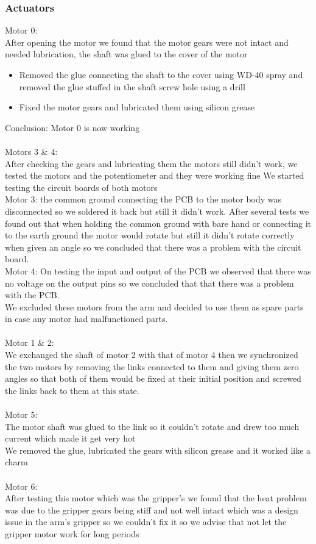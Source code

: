 \documentclass[11pt,a4paper]{report}
\begin{document}
\subsubsection{Actuators}
Motor 0:\\ 
After opening the motor we found that the motor gears were not intact and needed lubrication, the shaft was glued to the cover of the motor
\begin{itemize}
\item Removed the glue connecting the shaft to the cover using WD-40 spray and removed the glue stuffed in the shaft screw hole using a drill
\item Fixed the motor gears and lubricated them using silicon grease
\end{itemize}
Conclusion: Motor 0 is now working\\\\
Motors 3 \& 4: \\
After checking the gears and lubricating them the motors still didn't work, we tested the motors and the potentiometer and they were working fine We started testing the circuit boards of both motors\\
Motor 3: the common ground connecting the PCB to the motor body was disconnected so we soldered it back but still it didn't work. After several tests we found out that when holding the common ground with bare hand or connecting it to the earth ground the motor would rotate but still it didn't rotate correctly when given an angle so we concluded that there was a problem with the circuit board.\\
Motor 4: On testing the input and output of the PCB we observed that there was no voltage on the output pins so we concluded that that there was a problem with the PCB.\\
We excluded these motors from the arm and decided to use them as spare parts in case any motor had malfunctioned parts.\\\\
Motor 1 \& 2:\\
We exchanged the shaft of motor 2 with that of motor 4 then we synchronized the two motors by removing the links connected to them and giving them zero angles so that both of them would be fixed at their initial position and screwed the links back to them at this state.\\\\
Motor 5:\\
The motor shaft was glued to the link so it couldn't rotate and drew too much current which made it get very hot\\
We removed the glue, lubricated the gears with silicon grease and it worked like a charm\\\\
Motor 6:\\
After testing this motor which was the gripper's we found that the heat problem was due to the gripper gears being stiff and not well intact which was a design issue in the arm's gripper so we couldn't fix it so we advise that not let the gripper motor work for long periods\\\\
\end{document}
